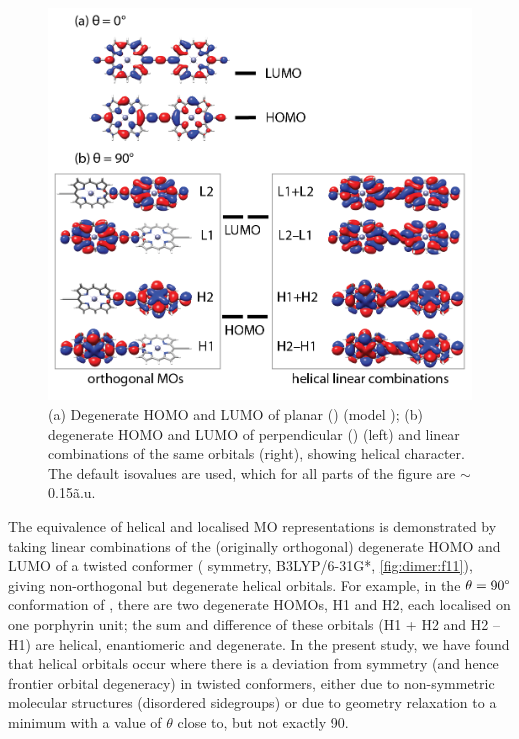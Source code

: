 		\begin{figure}[ht!]
			\centering\includegraphics{figures/dimer/Figure-11.png} 
			\caption[]{(a) Degenerate HOMO and LUMO of planar ()  (model ); (b) degenerate HOMO and LUMO of perpendicular ()  (left) and linear combinations of the same orbitals (right), showing helical character. The default isovalues are used, which for all parts of the figure are $\sim$0.15\~a.u.}
			\label{fig:dimer:f11}
		\end{figure}


		The equivalence of helical and localised MO representations is demonstrated by taking linear combinations of the (originally orthogonal) degenerate HOMO and LUMO of a twisted conformer ( symmetry, B3LYP/6-31G*, \autoref{fig:dimer:f11}), giving non-orthogonal but degenerate helical orbitals. For example, in the $\theta = 90\degree$ conformation of , there are two degenerate HOMOs, H1 and H2, each localised on one porphyrin unit; the sum and difference of these orbitals (H1 + H2 and H2 – H1) are helical, enantiomeric and degenerate. In the present study, we have found that helical orbitals occur where there is a deviation from  symmetry (and hence frontier orbital degeneracy) in twisted conformers, either due to non-symmetric molecular structures (disordered sidegroups) or due to geometry relaxation to a minimum with a value of $\theta$ close to, but not exactly 90\textdegree{}. 
		\FloatBarrier

